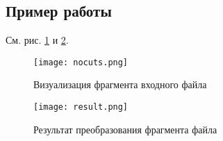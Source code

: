 \subsection{Пример работы}
\label{}

См. рис. \ref{fig:nocuts} и \ref{fig:result}.

\begin{figure}[!htb]
    \centering
    \texttt{[image: nocuts.png]}
    \caption{Визуализация фрагмента входного файла}
    \label{fig:nocuts}
\end{figure}

\begin{figure}[!htb]
    \centering
    \texttt{[image: result.png]}
    \caption{Результат преобразования фрагмента файла}
    \label{fig:result}
\end{figure}